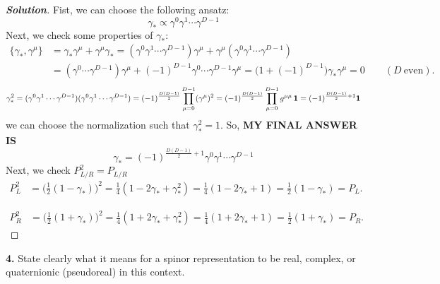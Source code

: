 \documentclass[11pt]{article}
\newenvironment{solution}[1][]{\begin{proof}[\textbf{Solution}]}{\end{proof}}
\begin{document}
\begin{solution}[13.3] Fist, we can choose the following ansatz:
	\[
	\gamma_*\propto\gamma^0\gamma^1\cdots\gamma^{D-1}
	\]
	Next, we check some properties of $\gamma_*$:
	$$
	\begin{aligned}
		\{\gamma_*,\gamma^\mu\}
		&=\gamma_*\gamma^\mu+\gamma^\mu\gamma_*
		=(\gamma^0\gamma^1\cdots\gamma^{D-1})\gamma^\mu+\gamma^\mu(\gamma^0\gamma^1\cdots\gamma^{D-1})\\
		&=(\gamma^0\cdots\gamma^{D-1})\gamma^\mu+(-1)^{D-1}\gamma^0\cdots\gamma^{D-1}\gamma^\mu
		=\bigl(1+(-1)^{D-1}\bigr)\gamma_*\gamma^\mu
		=0\qquad(D\ \text{even}).
	\end{aligned}
	$$
	$$
		\gamma_*^2
		=(\gamma^0\gamma^1\cdots\gamma^{D-1})(\gamma^0\gamma^1\cdots\gamma^{D-1})
		=(-1)^{\frac{D(D-1)}{2}}\prod_{\mu=0}^{D-1}(\gamma^\mu)^2\\
		=(-1)^{\frac{D(D-1)}{2}}\prod_{\mu=0}^{D-1}g^{\mu\mu}\,\mathbf 1=(-1)^{\frac{D(D-1)}{2}+1}\mathbf{1}
	$$
	we can choose the normalization such that $\gamma_*^2=1$. So, \textbf{MY FINAL ANSWER IS}
	$$
	\boxed{
	\gamma_*=(-1)^{\frac{D(D-1)}{2}+1}\gamma^0\gamma^1\cdots\gamma^{D-1}
}
	$$
	Next, we check $P_{L/R}^2=P_{L/R}$
	$$
	\begin{aligned}
		P_L^2
		&=\Big(\tfrac12(1-\gamma_*)\Big)^2
		=\tfrac14(1-2\gamma_*+\gamma_*^2)
		=\tfrac14(1-2\gamma_*+1)
		=\tfrac12(1-\gamma_*)
		=P_L.
	\end{aligned}
	$$
	
	$$
	\begin{aligned}
		P_R^2
		&=\Big(\tfrac12(1+\gamma_*)\Big)^2
		=\tfrac14(1+2\gamma_*+\gamma_*^2)
		=\tfrac14(1+2\gamma_*+1)
		=\tfrac12(1+\gamma_*)
		=P_R.
	\end{aligned}
	$$
	
\end{solution}
\begin{tcolorbox}[problem]
\textbf{4.} State clearly what it means for a spinor representation to be real, complex, or quaternionic (pseudoreal) in this context.
\end{tcolorbox}
\end{document}
